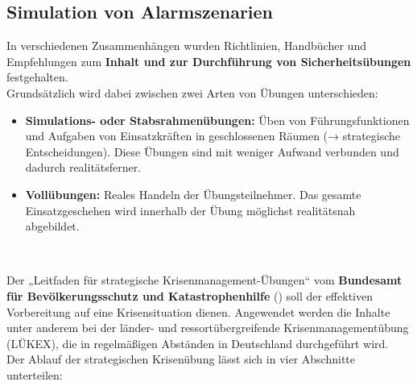 \newpage
\subsection{Simulation von Alarmszenarien}
\label{chap:standart_research}
In verschiedenen Zusammenhängen wurden Richtlinien, Handbücher und Empfehlungen zum \textbf{Inhalt und zur Durchführung von Sicherheitsübungen} festgehalten. \\
Grundsätzlich wird dabei zwischen zwei Arten von Übungen unterschieden:
\begin{itemize}
    \item \textbf{Simulations- oder Stabsrahmenübungen: } Üben von Führungsfunktionen und Aufgaben von Einsatzkräften in geschlossenen Räumen (→ strategische Entscheidungen). Diese Übungen sind mit weniger Aufwand verbunden und dadurch realitätsferner.   
    \item \textbf{Vollübungen: }Reales Handeln der Übungsteilnehmer. Das gesamte Einsatzgeschehen wird innerhalb der Übung möglichst realitätsnah abgebildet.
\end{itemize}\ 


Der „Leitfaden für strategische Krisenmanagement-Übungen“ vom \textbf{Bundesamt für Bevölkerungsschutz und Katastrophenhilfe} (\cite{strat_KrisenMGMT}) soll der effektiven Vorbereitung auf eine Krisensituation dienen. Angewendet werden die Inhalte unter anderem bei der länder- und ressortübergreifende Krisenmanagementübung (LÜKEX), die in regelmäßigen Abständen in Deutschland durchgeführt wird. \\
Der Ablauf der strategischen Krisenübung lässt sich in vier Abschnitte unterteilen:

